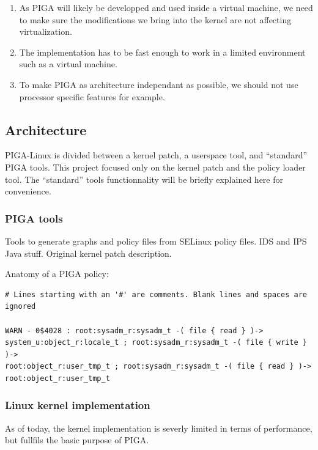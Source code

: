 \documentclass[pdftex,a4paper,titlepage,11pt]{article}
\begin{document}
\begin{enumerate}
	\item As PIGA will likely be developped and used inside a virtual machine,
we need to make sure the modifications we bring into the kernel are not
affecting virtualization.
	\item The implementation has to be fast enough to work in a limited
environment such as a virtual machine.
	\item To make PIGA as architecture independant as possible, we should not
use processor specific features for example.
\end{enumerate}


\subsection{Architecture}

PIGA-Linux is divided between a kernel patch, a userspace tool, and ``standard''
PIGA tools. This project focused only on the kernel patch and the policy loader
tool. The ``standard'' tools functionnality will be briefly explained here for
convenience.

\subsubsection{PIGA tools}

Tools to generate graphs and policy files from SELinux policy files. IDS and IPS
Java stuff. Original kernel patch description.

Anatomy of a PIGA policy:

\begin{lstlisting}
# Lines starting with an '#' are comments. Blank lines and spaces are ignored

WARN - 0$4028 : root:sysadm_r:sysadm_t -( file { read } )->
system_u:object_r:locale_t ; root:sysadm_r:sysadm_t -( file { write } )->
root:object_r:user_tmp_t ; root:sysadm_r:sysadm_t -( file { read } )->
root:object_r:user_tmp_t
\end{lstlisting}


\subsubsection{Linux kernel implementation}

As of today, the kernel implementation is severly limited in terms of
performance, but fullfils the basic purpose of PIGA.

\bigskip
\end{document}
